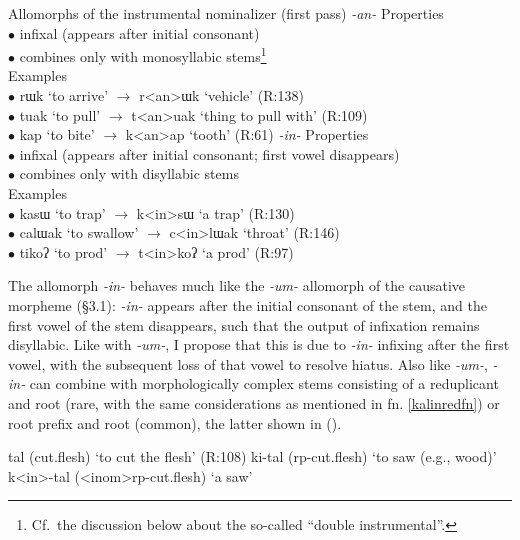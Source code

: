 \documentclass[output=paper,colorlinks,citecolor=brown,
]{langscibook}
\newcounter{nexttmp}    %
\newcommand{\Next}{\setcounter{nexttmp}{\value{equation}}\stepcounter{nexttmp}(\thenexttmp)\xspace}
\begin{document}
\ea Allomorphs of the instrumental nominalizer (first pass) \label{kalininstallos}
\ea \textit{-an-} \label{kalininstallosb}
\ea Properties\\
$\bullet$ infixal (appears after initial consonant)\\
$\bullet$ combines only with monosyllabic stems\footnote{Cf.\ the discussion below about the so-called ``double instrumental''.}\\
\ex Examples\\
$\bullet$ rɯk `to arrive' $\rightarrow$ r<an>ɯk `vehicle' \hfill (R:138)\\
$\bullet$ tuak `to pull' $\rightarrow$ t<an>uak `thing to pull with' \hfill (R:109)\\
$\bullet$ kap `to bite' $\rightarrow$ k<an>ap `tooth' \hfill (R:61)
\z
\ex \textit{-in-} \label{kalininstallosa}
\ea  Properties\\
$\bullet$ infixal (appears after initial consonant; first vowel disappears)\\
$\bullet$ combines only with disyllabic stems\\
\ex Examples\\
$\bullet$ kasɯ `to trap' $\rightarrow$ k<in>sɯ `a trap' \hfill (R:130)\\
$\bullet$ calɯak `to swallow' $\rightarrow$ c<in>lɯak `throat' \hfill (R:146)\\
$\bullet$ tikoʔ `to prod' $\rightarrow$ t<in>koʔ `a prod' \hfill (R:97)
\z
\z
\z

The allomorph \textit{-in-} behaves much like the \textit{-um-} allomorph of the causative morpheme (\S3.1): \textit{-in-} appears after the initial consonant of the stem, and the first vowel of the stem disappears, such that the output of infixation remains disyllabic. Like with \textit{-um-}, I propose that this is due to \textit{-in-} infixing after the first vowel, with the subsequent loss of that vowel to resolve hiatus. Also like  \textit{-um-},  \textit{-in-} can combine with morphologically complex stems consisting of a reduplicant and root (rare, with the same considerations as mentioned in fn. \ref{kalinredfn}) or root prefix and root (common), the latter shown in \Next.

\ea
\ea tal (cut.flesh) \hfill `to cut the flesh' (R:108)
\ex ki-tal ({\sc rp-}cut.flesh) \hfill `to saw (e.g., wood)' 
\ex k<in>-tal ({\sc <inom>rp-}cut.flesh) \hfill `a saw' \label{kalinrpinstc}
\z
\z
\end{document}
